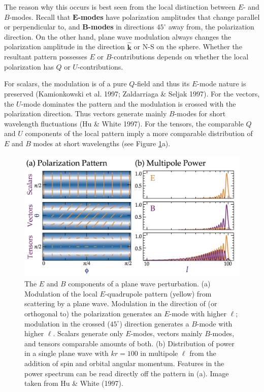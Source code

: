 \documentclass[a4paper,10pt]{article}
\begin{document}
{\noindent}The reason why this occurs is best seen from the local distinction between $E$- and $B$-modes. Recall that $\mathbf{E}$\textbf{-modes} have polarization amplitudes that change parallel or perpendicular to, and $\mathbf{B}$\textbf{-modes} in directions $45^\circ$ away from, the polarization direction. On the other hand, plane wave modulation always changes the polarization amplitude in the direction $\bm{\hat{k}}$ or N-S on the sphere. Whether the resultant pattern possesses $E$ or $B$-contributions depends on whether the local polarization has $Q$ or $U$-contributions.

{\noindent}For scalars, the modulation is of a pure $Q$-field and thus its $E$-mode nature is preserved (Kamionkowski et al. 1997; Zaldarriaga \& Seljak 1997). For the vectors, the $U$-mode dominates the pattern and the modulation is crossed with the polarization direction. Thus vectors generate mainly $B$-modes for short wavelength fluctuations (Hu \& White 1997). For the tensors, the comparable $Q$ and $U$ components of the local pattern imply a more comparable distribution of $E$ and $B$ modes at short wavelengths (see Figure \ref{fig:polpatterns}a).

\begin{figure}[t!]
    \centering
    \includegraphics[width=16cm]{figures/PolPatterns.png}
    \caption{\footnotesize{The $E$ and $B$ components of a plane wave perturbation. (a) Modulation of the local $E$-quadrupole pattern (yellow) from scattering by a plane wave. Modulation in the direction of (or orthogonal to) the polarization generates an $E$-mode with higher $\ell$; modulation in the crossed ($45^\circ$) direction generates a $B$-mode with higher $\ell$. Scalars generate only $E$-modes, vectors mainly $B$-modes, and tensors comparable amounts of both. (b) Distribution of power in a single plane wave with $kr=100$ in multipole $\ell$ from the addition of spin and orbital angular momentum. Features in the power spectrum can be read directly off the pattern in (a). Image taken from Hu \& White (1997).}}
    \label{fig:polpatterns}
\end{figure}
\end{document}
